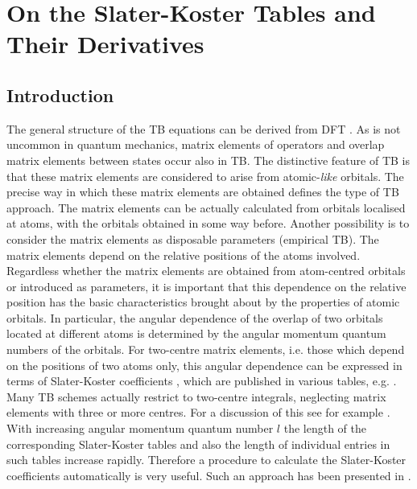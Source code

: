 \chapter[SK Tables]%
{On the Slater-Koster Tables and Their Derivatives}
\label{ch:two}
%
%
\section{Introduction}
\par{The general structure of the TB
equations can be derived from DFT \citep{Finnis03,Foulkes89,Frauenheim00}.
As is not uncommon in quantum mechanics, matrix elements of
operators and overlap matrix elements between states occur also in TB.
The distinctive feature of TB is that these matrix elements are considered to arise from atomic-{\it like}
orbitals. The precise way in which these matrix elements are obtained defines the type of TB approach.
The matrix elements can be actually calculated from orbitals localised at atoms, with the orbitals obtained
in some way before. Another possibility is to consider the matrix elements as disposable parameters
(empirical TB). The matrix elements depend on the relative positions of the atoms involved. Regardless whether
the matrix elements are obtained from atom-centred orbitals or introduced as parameters, it is important that
this dependence on the relative position has the basic characteristics brought about by the properties of
atomic orbitals. In particular, the angular dependence of the overlap of two orbitals located at different
atoms is determined by the angular momentum quantum numbers of the orbitals. For two-centre matrix elements,
i.e. those which depend on the positions of two atoms only, this angular dependence can be expressed in terms
of Slater-Koster coefficients \citep{Slater54}, which are published in various
tables, e.g. \citep{Slater54,Sharma79,Sharma80,Sharma80b}. Many TB schemes
actually restrict to two-centre integrals, neglecting matrix elements with three or more centres. For a
discussion of this see for example \citep{Finnis03}.
With increasing angular momentum quantum number $l$ the length of the corresponding Slater-Koster tables and
also the length of individual entries in such tables increase rapidly. Therefore a procedure to calculate
the Slater-Koster coefficients automatically is very useful. Such an approach has been presented in
\citep{Sharma80b,Kollar94,Podolskiy04}.}
